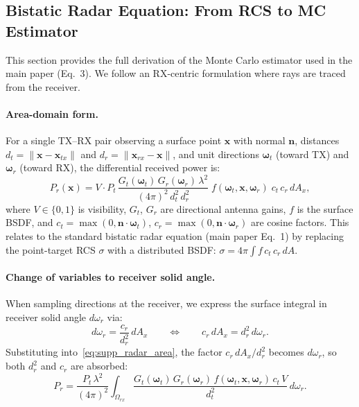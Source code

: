 \subsection{Bistatic Radar Equation: From RCS to MC Estimator}
\label{sec:supp_mc_derivation}

This section provides the full derivation of the Monte Carlo estimator used in the main paper (Eq.~3). We follow an RX-centric formulation where rays are traced from the receiver.

\paragraph{Area-domain form.}
For a single TX--RX pair observing a surface point $\mathbf{x}$ with normal $\mathbf{n}$, distances $d_t = \|\mathbf{x} - \mathbf{x}_{tx}\|$ and $d_r = \|\mathbf{x}_{rx} - \mathbf{x}\|$, and unit directions $\boldsymbol{\omega}_t$ (toward TX) and $\boldsymbol{\omega}_r$ (toward RX), the differential received power is:
\begin{equation}
    P_r(\mathbf{x})
    =
    V \cdot P_t\,
    \frac{G_t(\boldsymbol{\omega}_t)\,G_r(\boldsymbol{\omega}_r)\,\lambda^2}{(4\pi)^2\, d_t^2\, d_r^2}
    \;
    f(\boldsymbol{\omega}_t, \mathbf{x}, \boldsymbol{\omega}_r)\;
    c_t\, c_r\, dA_x,
    \label{eq:supp_radar_area}
\end{equation}
where $V \in \{0,1\}$ is visibility, $G_t$, $G_r$ are directional antenna gains, $f$ is the surface BSDF, and $c_t = \max(0, \mathbf{n} \cdot \boldsymbol{\omega}_t)$, $c_r = \max(0, \mathbf{n} \cdot \boldsymbol{\omega}_r)$ are cosine factors. This relates to the standard bistatic radar equation (main paper Eq.~1) by replacing the point-target RCS $\sigma$ with a distributed BSDF: $\sigma = 4\pi \int f \, c_t \, c_r \, dA$.

\paragraph{Change of variables to receiver solid angle.}
When sampling directions at the receiver, we express the surface integral in receiver solid angle $d\omega_r$ via:
\begin{equation}
    d\omega_r = \frac{c_r}{d_r^2}\, dA_x
    \qquad \Longleftrightarrow \qquad
    c_r\,dA_x = d_r^2\, d\omega_r.
    \label{eq:supp_omega_area}
\end{equation}
Substituting into~\eqref{eq:supp_radar_area}, the factor $c_r\,dA_x / d_r^2$ becomes $d\omega_r$, so both $d_r^2$ and $c_r$ are absorbed:
\begin{equation}
    P_r
    =
    \frac{P_t\,\lambda^2}{(4\pi)^2}
    \int_{\Omega_{rx}}
    \frac{
    G_t(\boldsymbol{\omega}_t)\,G_r(\boldsymbol{\omega}_r)\,
    f(\boldsymbol{\omega}_t, \mathbf{x}, \boldsymbol{\omega}_r)\,
    c_t\, V
    }{
    d_t^2
    }
    \, d\omega_r.
    \label{eq:supp_solid_angle}
\end{equation}

